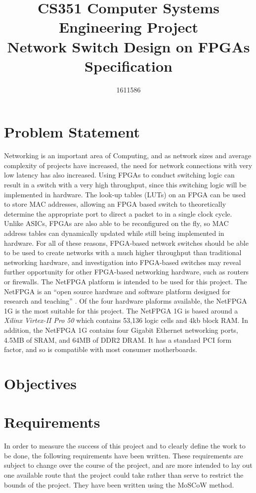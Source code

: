 \documentclass[12pt, a4paper, twoside, onecolumn]{IEEEtran}
\title{CS351 Computer Systems Engineering Project \\ Network Switch Design on FPGAs \\ \Large{Specification}}
\author{1611586}
\begin{document}
\maketitle

\section{Problem Statement}
\label{problem_statement}
Networking is an important area of Computing, and as network sizes and average complexity of projects have increased,
the need for network connections with very low latency has also increased.
Using FPGAs to conduct switching logic can result in a switch with a very high throughput, since this switching logic will be implemented in hardware. The look-up tables (LUTs) on an FPGA can be used to store MAC addresses, allowing an FPGA based switch to theoretically determine the appropriate port to direct a packet to in a single clock cycle. Unlike ASICs, FPGAs are also able to be reconfigured on the fly, so MAC address tables can dynamically updated while still being implemented in hardware.
For all of these reasons, FPGA-based network switches should be able to be used to create networks with a much higher throughput than traditional networking hardware, and investigation into FPGA-based switches may reveal further opportunity for other FPGA-based networking hardware, such as routers or firewalls.
The NetFPGA \cite{NetFPGA} platform is intended to be used for this project. The NetFPGA is an ``open source hardware and software platform designed for research and teaching'' \cite{NetFPGA_about}. Of the four hardware plaforms available, the NetFPGA 1G \cite{NetFPGA_1G} is the most suitable for this project. The NetFPGA 1G is based around a \textit{Xilinx Virtex-II Pro 50} \cite{virtex2-pro} which contains 53,136 logic cells and 4kb block RAM. In addition, the NetFPGA 1G contains four Gigabit Ethernet networking ports, 4.5MB of SRAM, and 64MB of DDR2 DRAM. It has a standard PCI form factor, and so is compatible with most consumer motherboards.  

\section{Objectives}
\label{objectives}
\section{Requirements}
\label{requirements}
In order to measure the success of this project and to clearly define the work to be done, the following requirements have been written. These requirements are subject to change over the course of the project, and are more intended to lay out one available route that the project could take rather than serve to restrict the bounds of the project. They have been written using the MoSCoW method.
\end{document}

